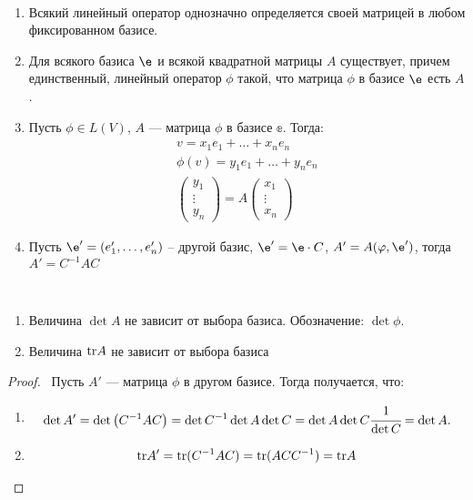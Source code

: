 \begin{Consequence}\
    \begin{enumerate}
        \item Всякий линейный оператор однозначно определяется своей матрицей в любом фиксированном базисе.
        \item Для всякого базиса $\e$ и всякой квадратной матрицы $A$ существует, причем единственный, линейный оператор $\phi$ такой, что матрица $\phi$ в базисе $\e$ есть $A$.
        \item Пусть $\phi \in L(V)$, $A$ --- матрица $\phi$ в базисе $\mathbb{e}$. Тогда:
        \begin{gather*}
            v = x_1e_1 + \ldots + x_ne_n\\ \phi(v) = y_1e_1 + \ldots + y_n e_n \\
            \begin{pmatrix}
                y_1\\
                \vdots \\
                y_n
            \end{pmatrix} = A \begin{pmatrix}
                x_1\\
                \vdots \\
                x_n
            \end{pmatrix}
        \end{gather*}
        \item Пусть $\e' = (e_1', \ldots, e_n')$ -- другой базис, $\e' = \e\cdot C$, $A' = A(\phi, \e')$, тогда $A' = C^{-1}AC$
    \end{enumerate}
\end{Consequence}

\begin{Consequence}\
  \begin{enumerate}
    \item Величина $\det A$ не зависит от выбора базиса. Обозначение: $\det\phi$.
    \item Величина $\mathrm{tr} A$ не зависит от выбора базиса
  \end{enumerate}
\end{Consequence}

\begin{proof}\
  Пусть $A'$ --- матрица $\phi$ в другом базисе. Тогда получается, что:
  \begin{enumerate}
    \item 
    \begin{gather*}
        \det A' = \det \left(C^{-1}AC\right) = \det C^{-1} \det A \det C = \det A \det C \cfrac{1}{\det C} = \det A.
    \end{gather*}
    \item
      \begin{gather*}
        \mathrm{tr} A' = \mathrm{tr} (C^{-1}AC) = \mathrm{tr} (ACC^{-1}) = \mathrm{tr} A
      \end{gather*}
  \end{enumerate}
\end{proof}

